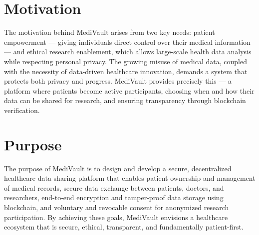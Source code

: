 \section{Motivation}
The motivation behind MediVault arises from two key needs: patient empowerment — giving individuals direct control over their medical information — and ethical research enablement, which allows large-scale health data analysis while respecting personal privacy. The growing misuse of medical data, coupled with the necessity of data-driven healthcare innovation, demands a system that protects both privacy and progress. MediVault provides precisely this — a platform where patients become active participants, choosing when and how their data can be shared for research, and ensuring transparency through blockchain verification.

\section{Purpose}
The purpose of MediVault is to design and develop a secure, decentralized healthcare data sharing platform that enables patient ownership and management of medical records, secure data exchange between patients, doctors, and researchers, end-to-end encryption and tamper-proof data storage using blockchain, and voluntary and revocable consent for anonymized research participation. By achieving these goals, MediVault envisions a healthcare ecosystem that is secure, ethical, transparent, and fundamentally patient-first.
